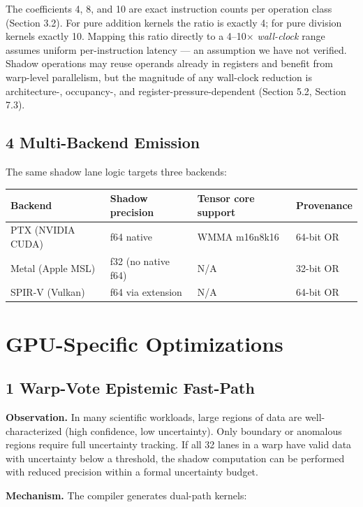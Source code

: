 \documentclass[11pt]{article}
\begin{document}
{{The coefficients 4, 8, and 10 are exact instruction counts per operation class (Section 3.2). For pure addition kernels the ratio is exactly 4; for pure division kernels exactly 10. Mapping this ratio directly to a 4–10$\times$ \emph{wall-clock} range assumes uniform per-instruction latency --- an assumption we have not verified. Shadow operations may reuse operands already in registers and benefit from warp-level parallelism, but the magnitude of any wall-clock reduction is architecture-, occupancy-, and register-pressure-dependent (Section 5.2, Section 7.3).

\subsection{4 Multi-Backend Emission}

The same shadow lane logic targets three backends:

\begin{table}[t]\centering
\begin{tabular}{llll}
\toprule
Backend & Shadow precision & Tensor core support & Provenance \\
\midrule
PTX (NVIDIA CUDA) & f64 native & WMMA m16n8k16 & 64-bit OR \\
Metal (Apple MSL) & f32 (no native f64) & N/A & 32-bit OR \\
SPIR-V (Vulkan) & f64 via extension & N/A & 64-bit OR \\
\bottomrule
\end{tabular}
\end{table}


\section{GPU-Specific Optimizations}

\subsection{1 Warp-Vote Epistemic Fast-Path}

\textbf{Observation.} In many scientific workloads, large regions of data are well-characterized (high confidence, low uncertainty). Only boundary or anomalous regions require full uncertainty tracking. If all 32 lanes in a warp have valid data with uncertainty below a threshold, the shadow computation can be performed with reduced precision within a formal uncertainty budget.

\textbf{Mechanism.} The compiler generates dual-path kernels:

}}
\end{document}
